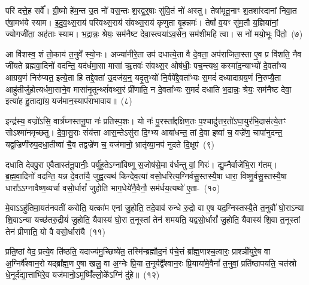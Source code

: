 परि॑ दत्ते॒ह सर्वे᳚। ग्री॒ष्मो हे॑म॒न्त उ॒त नो॑ वस॒न्तः श॒रद्व॒र्॒\mbox{}षाः सु॑वि॒तं नो॑ अस्तु। तेषा॑मृतू॒नाꣳ श॒तशा॑रदानां निवा॒त ए॑षा॒मभ॑ये स्याम। इ॒दु॒व॒थ्स॒राय॑ परिवथ्स॒राय॑ संवथ्स॒राय॑ कृणुता बृ॒हन्नमः॑। तेषां᳚ व॒यꣳ सु॑म॒तौ य॒ज्ञिया॑नां॒ ज्योगजी॑ता॒ अह॑ताः स्याम। भ॒द्रान्नः॒ श्रेयः॒ सम॑नैष्ट देवा॒स्त्वया॑\-ऽव॒सेन॒ सम॑शीमहि त्वा। स नो॑ मयो॒भूः पि॑तो॒~(७)\ip

आ वि॑शस्व॒ शं तो॒काय॑ त॒नुवे᳚ स्यो॒नः। अज्या॑नीरे॒ता उप॑ दधात्ये॒ता वै दे॒वता॒ अप॑राजिता॒स्ता ए॒व प्र वि॑शति॒ नैव जी॑यते ब्रह्मवा॒दिनो॑ वदन्ति॒ यद॑र्धमा॒सा मासा॑ ऋ॒तवः॑ संवथ्स॒र ओष॑धीः॒ पच॒न्त्यथ॒ कस्मा॑द॒न्याभ्यो॑ दे॒वता᳚भ्य आग्रय॒णं निरु॑प्यत॒ इत्ये॒ता हि तद्दे॒वता॑ उ॒दज॑य॒न्॒ यदृ॒तुभ्यो॑ नि॒र्वपे᳚द्दे॒वता᳚भ्यः स॒मदं॑ दध्यादाग्रय॒णं नि॒रुप्यै॒ता आहु॑तीर्जुहोत्यर्धमा॒साने॒व मासा॑नृ॒तून्थ्सं॑वथ्स॒रं प्री॑णाति॒ न दे॒वता᳚भ्यः स॒मदं॑ दधाति भ॒द्रान्नः॒ श्रेयः॒ सम॑नैष्ट देवा॒ इत्या॑ह हु॒ताद्या॑य॒ यज॑मान॒स्याप॑राभावाय॥~(८)\ip

{\anuvakamend[{प्रा॒जा॒प॒त्यां लो॒काय॑ देवाः पितो दध्यादाग्रय॒णं पञ्च॑विꣳशतिश्च}]}

इन्द्र॑स्य॒ वज्रो॑\-ऽसि॒ वार्त्र॑घ्नस्तनू॒पा नः॑ प्रतिस्प॒शः। यो नः॑ पु॒रस्ता᳚द्दक्षिण॒तः प॒श्चादु॑त्तर॒तो॑\-ऽघा॒युर॑भि॒दास॑त्ये॒तꣳ सो\-ऽश्मा॑नमृच्छतु। दे॒वा॒सु॒राः संय॑त्ता आस॒न्ते\-ऽसु॑रा दि॒ग्भ्य आबा॑धन्त॒ तां दे॒वा इष्वा॑ च॒ वज्रे॑ण॒ चापा॑नुदन्त॒ यद्व॒ज्रिणी॑रुप॒दधा॒तीष्वा॑ चै॒व तद्वज्रे॑ण च॒ यज॑मानो॒ भ्रातृ॑व्या॒नप॑ नुदते दि॒क्षूप॑~(९)\ip

दधाति देवपु॒रा ए॒वैतास्त॑नू॒पानीः॒ पर्यू॑ह॒ते\-ऽग्ना॑विष्णू स॒जोष॑से॒मा व॑र्धन्तु वां॒ गिरः॑। द्यु॒म्नैर्वाजे॑भि॒रा ग॑तम्। ब्र॒ह्म॒वा॒दिनो॑ वदन्ति॒ यन्न दे॒वता॑यै॒ जुह्व॒त्यथ॑ किन्देव॒त्या॑ वसो॒र्धारेत्य॒ग्निर्वसु॒स्तस्यै॒षा धारा॒ विष्णु॒र्वसु॒स्तस्यै॒षा धारा᳚\-ऽऽग्नावैष्ण॒व्यर्चा वसो॒र्धारां᳚ जुहोति भाग॒\-धेये॑नै॒वैनौ॒ सम॑र्धय॒त्यथो॑ ए॒ता-~(१०)\ip

मे॒वा\-ऽऽहु॑तिमा॒यत॑नवतीं करोति॒ यत्का॑म एनां जु॒होति॒ तदे॒वाव॑ रुन्धे रु॒द्रो वा ए॒ष यद॒ग्निस्तस्यै॒ते त॒नुवौ॑ घो॒रा\-ऽन्या शि॒वा\-ऽन्या यच्छ॑तरु॒द्रीयं॑ जु॒होति॒ यैवास्य॑ घो॒रा त॒नूस्तां तेन॑ शमयति॒ यद्वसो॒र्धारां᳚ जु॒होति॒ यैवास्य॑ शि॒वा त॒नूस्तां तेन॑ प्रीणाति॒ यो वै वसो॒र्धारा॑यै~(११)\ip

प्रति॒ष्ठां वेद॒ प्रत्ये॒व ति॑ष्ठति॒ यदाज्य॑मु॒च्छिष्ये॑त॒ तस्मि॑न्ब्रह्मौद॒नं प॑चे॒त्तं ब्रा᳚ह्म॒णाश्च॒त्वारः॒ प्राश्ञी॑युरे॒ष वा अ॒ग्निर्वै᳚श्वान॒रो यद्ब्रा᳚ह्म॒ण ए॒षा खलु॒ वा अ॒ग्नेः प्रि॒या त॒नूर्यद्वै᳚श्वान॒रः प्रि॒याया॑मे॒वैनां᳚ त॒नुवां॒ प्रति॑\-ष्ठापयति॒ चत॑स्रो धे॒नूर्द॑द्या॒त्ताभि॑रे॒व यज॑मानो॒\-ऽमुष्मिँ॑ल्लो॒के᳚\-ऽग्निं दु॑हे॥~(१२)\ip

